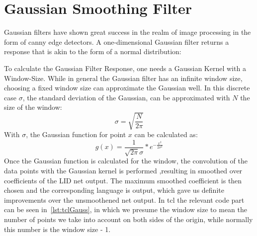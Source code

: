 \section{Gaussian Smoothing Filter}
\label{sec:eval:GSF}
Gaussian filters have shown great success in the realm of image processing in the form of canny edge detectors. 
A one-dimensional Gaussian filter returns a response that is akin to the form of a normal distribution:
\begin{figure}[h!]
\centering
{}
\end{figure}
To calculate the Gaussian Filter Response, one needs a Gaussian Kernel with a Window-Size. While in general the Gaussian filter has an infinite window size, choosing a fixed window size can approximate the Gaussian well. In this discrete case \(\sigma\), the standard deviation of the Gaussian, can be approximated with \(N\) the size of the window:
\begin{equation}
\sigma  =\sqrt{\frac{N}{2\pi}}
\end{equation}
With \(\sigma\), the Gaussian function for point \(x\) can be calculated as:
\begin{equation}
g(x) = \frac{1}{\sqrt{2\pi}\sigma} * e^{{- \frac{x^2}{2\sigma^2}}}
\end{equation}
Once the Gaussian function is calculated for the window, the convolution of the data points with the Gaussian kernel is performed ,resulting in smoothed over coefficients of the LID net output. The maximum smoothed coefficient is then chosen and the corresponding language is output, which gave us definite improvements over the unsmoothened net output. In tcl the relevant code part can be seen in~\ref{lst:tclGauss}, in which we presume the window size to mean the number of points we take into account on both sides of the origin, while normally this number is the window size - 1.
